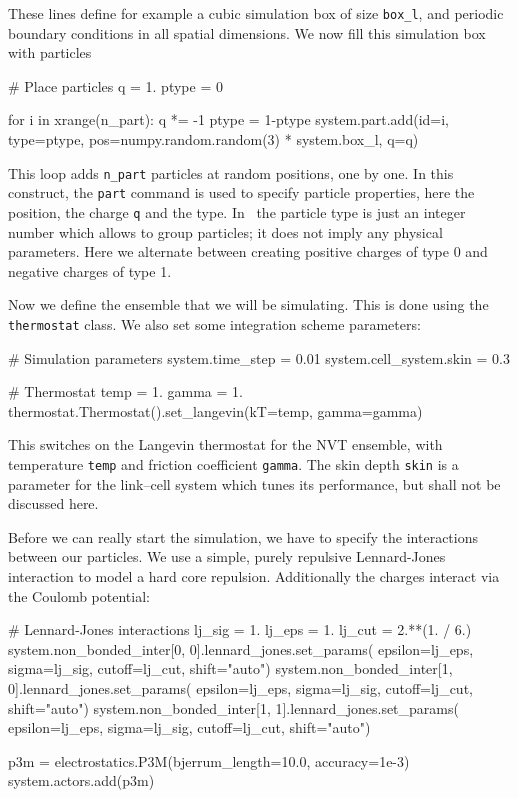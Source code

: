 \documentclass[
a4paper,                        %
11pt,                           %
twoside,                        %
footsepline,                    %
headsepline,                    %
headexclude,                    %
footexclude,                    %
pagesize,                       %
]{scrartcl}
\begin{document}
These lines define for example a cubic simulation box of size 
\verb|box_l|, and periodic boundary conditions in all spatial dimensions. 
We now fill this simulation box with particles

\begin{tclcode}
# Place particles
q = 1.
ptype = 0

for i in xrange(n_part):
    q *= -1
    ptype = 1-ptype
    system.part.add(id=i, type=ptype, 
                    pos=numpy.random.random(3) * system.box_l, q=q)
\end{tclcode}

This loop adds \verb|n_part| particles at random positions, one by
one.  In this construct, the \verb|part| command is used to specify 
particle properties, here the position, the charge \verb|q| and the type. 
In \es\ the particle type is just an integer number which allows to group
particles; it does not imply any physical parameters. Here we 
alternate between creating positive charges of type 0 and negative
charges of type 1.

Now we define the ensemble that we will be simulating. This is done
using the \verb|thermostat| class. We also set some integration
scheme parameters:

\begin{tclcode}
# Simulation parameters
system.time_step = 0.01
system.cell_system.skin = 0.3

# Thermostat
temp = 1.
gamma = 1.
thermostat.Thermostat().set_langevin(kT=temp, gamma=gamma)
\end{tclcode}

This switches on the Langevin thermostat for the NVT ensemble, with
temperature \verb|temp| and friction coefficient \verb|gamma|. The skin depth
\verb|skin| is a parameter for the link--cell system which tunes its
performance, but shall not be discussed here.

Before we can really start the simulation, we have to specify the
interactions between our particles.  We use a simple, purely repulsive
Lennard-Jones interaction to model a hard core repulsion. Additionally the
charges interact via the Coulomb potential:

\begin{tclcode}
# Lennard-Jones interactions
lj_sig = 1.
lj_eps = 1.
lj_cut = 2.**(1. / 6.)
system.non_bonded_inter[0, 0].lennard_jones.set_params(
    epsilon=lj_eps, sigma=lj_sig, cutoff=lj_cut, shift="auto")
system.non_bonded_inter[1, 0].lennard_jones.set_params(
    epsilon=lj_eps, sigma=lj_sig, cutoff=lj_cut, shift="auto")
system.non_bonded_inter[1, 1].lennard_jones.set_params(
    epsilon=lj_eps, sigma=lj_sig, cutoff=lj_cut, shift="auto")

p3m = electrostatics.P3M(bjerrum_length=10.0, accuracy=1e-3)
system.actors.add(p3m)
\end{tclcode}
\end{document}
